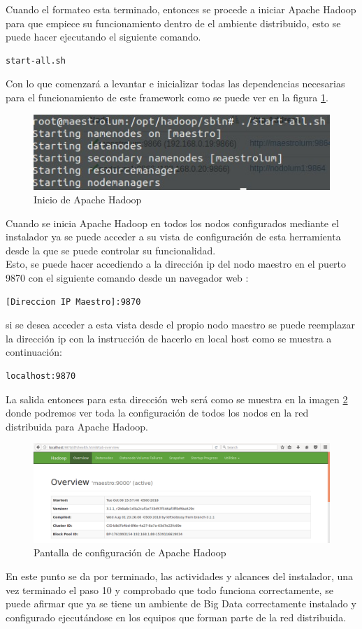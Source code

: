 Cuando el formateo esta terminado, entonces se procede a iniciar Apache Hadoop para que empiece su funcionamiento dentro de el ambiente distribuido, esto se puede hacer ejecutando el siguiente comando.
\begin{verbatim}
start-all.sh
\end{verbatim}
Con lo que comenzará a levantar e inicializar todas las dependencias necesarias para el funcionamiento de este framework como se puede ver en la figura \ref{fig:inicio}. 
\begin{figure}[H]
	\hypertarget{fig:inicio}{\hspace{1pt}}
	\begin{center}	
		\includegraphics[width=.5\textwidth]{capitulo5/images/indice.jpeg}
		\caption{Inicio de Apache Hadoop}
		\label{fig:inicio}
	\end{center}
\end{figure}
Cuando se inicia Apache Hadoop en todos los nodos configurados mediante el instalador ya se puede acceder a su vista de configuración de esta herramienta desde la que se puede controlar su funcionalidad.
\\
Esto, se puede hacer accediendo a la dirección ip del nodo maestro en el puerto 9870 con el siguiente comando desde un navegador web :
\begin{verbatim}
[Direccion IP Maestro]:9870
\end{verbatim}
si se desea acceder a esta vista desde el propio nodo maestro se puede reemplazar la dirección ip con la instrucción de hacerlo en local host como se muestra a continuación:
\begin{verbatim}
localhost:9870
\end{verbatim}
La salida entonces para esta dirección web será como se muestra en la imagen \ref{fig:confi} donde podremos ver toda la configuración de todos los nodos en la red distribuida para Apache Hadoop. 

\begin{figure}[H]
	\hypertarget{fig:confi}{\hspace{1pt}}
	\begin{center}	
		\includegraphics[width=.7\textwidth]{capitulo5/images/im54.png}
		\caption{Pantalla de configuración de Apache Hadoop}
		\label{fig:confi}
	\end{center}
\end{figure}
En este punto se da por terminado, las actividades y alcances del instalador, una vez terminado el paso 10 y comprobado que todo funciona correctamente, se puede afirmar que ya se tiene un ambiente de Big Data correctamente instalado y configurado ejecutándose en los equipos que forman parte de la red distribuida.


